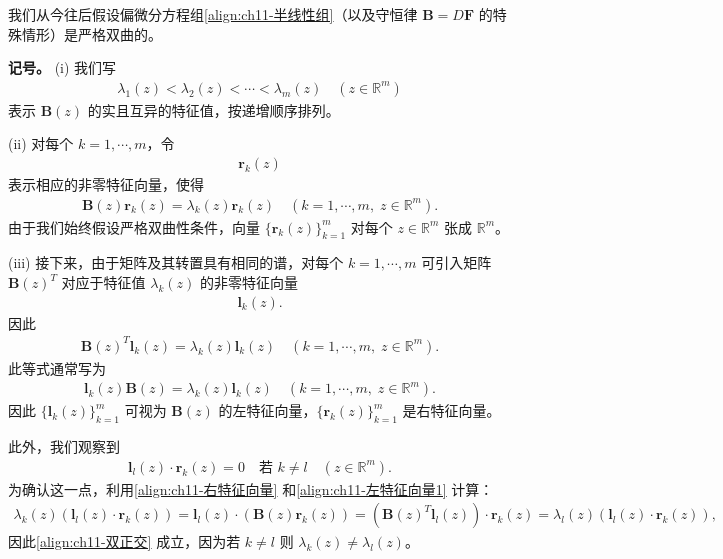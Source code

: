 \documentclass[../../main.tex]{subfiles}
\begin{document}
我们从今往后假设偏微分方程组\eqref{align:ch11-半线性组}（以及守恒律 $\mathbf{B}=D\mathbf{F}$ 的特殊情形）是严格双曲的。

\textbf{记号。}
(i) 我们写
\begin{align}
\lambda_1(z)<\lambda_2(z)<\cdots<\lambda_m(z) \quad (z\in\mathbb{R}^m)
\label{align:ch11-特征值排序}
\end{align}
表示 $\mathbf{B}(z)$ 的实且互异的特征值，按递增顺序排列。

(ii) 对每个 $k=1,\cdots,m$，令
\begin{align*}
\mathbf{r}_k(z)
\end{align*}
表示相应的非零特征向量，使得
\begin{align}
\mathbf{B}(z)\mathbf{r}_k(z)=\lambda_k(z)\mathbf{r}_k(z) \quad (k=1,\cdots,m,\;z\in\mathbb{R}^m).
\label{align:ch11-右特征向量}
\end{align}
由于我们始终假设严格双曲性条件，向量 $\{\mathbf{r}_k(z)\}_{k=1}^m$ 对每个 $z\in\mathbb{R}^m$ 张成 $\mathbb{R}^m$。

(iii) 接下来，由于矩阵及其转置具有相同的谱，对每个 $k=1,\cdots,m$ 可引入矩阵 $\mathbf{B}(z)^T$ 对应于特征值 $\lambda_k(z)$ 的非零特征向量
\begin{align*}
\mathbf{l}_k(z).
\end{align*}
因此
\begin{align}
\mathbf{B}(z)^T\mathbf{l}_k(z)=\lambda_k(z)\mathbf{l}_k(z) \quad (k=1,\cdots,m,\;z\in\mathbb{R}^m).
\label{align:ch11-左特征向量1}
\end{align}
此等式通常写为
\begin{align}
\mathbf{l}_k(z)\mathbf{B}(z)=\lambda_k(z)\mathbf{l}_k(z) \quad (k=1,\cdots,m,\;z\in\mathbb{R}^m).
\label{align:ch11-左特征向量2}
\end{align}
因此 $\{\mathbf{l}_k(z)\}_{k=1}^m$ 可视为 $\mathbf{B}(z)$ 的左特征向量，$\{\mathbf{r}_k(z)\}_{k=1}^m$ 是右特征向量。

\begin{remark}\label{remark:ch11-双正交性}
此外，我们观察到
\begin{align}
\mathbf{l}_l(z)\cdot\mathbf{r}_k(z)=0 \quad \text{若 } k\neq l \quad (z\in\mathbb{R}^m).
\label{align:ch11-双正交}
\end{align}
为确认这一点，利用\eqref{align:ch11-右特征向量} 和\eqref{align:ch11-左特征向量1} 计算：
\begin{align*}
\lambda_k(z)(\mathbf{l}_l(z)\cdot\mathbf{r}_k(z))=\mathbf{l}_l(z)\cdot(\mathbf{B}(z)\mathbf{r}_k(z))=(\mathbf{B}(z)^T\mathbf{l}_l(z))\cdot\mathbf{r}_k(z)=\lambda_l(z)(\mathbf{l}_l(z)\cdot\mathbf{r}_k(z)),
\end{align*}
因此\eqref{align:ch11-双正交} 成立，因为若 $k\neq l$ 则 $\lambda_k(z)\neq\lambda_l(z)$。
\end{remark}
\end{document}
